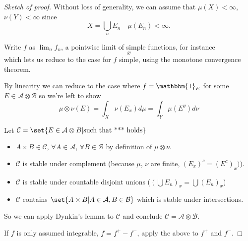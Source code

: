 \documentclass{article}
\newcommand{\1}[1]{\mathbbm{1}_{#1}}
\begin{document}
\begin{proof}[Sketch of proof]
    Without loss of generality, we can assume that $\mu(X) < \infty$, $\nu(Y) < \infty$ since
    \begin{equation*}
        X = \bigcup_n E_n \quad \mu(E_n) < \infty.
    \end{equation*}

    Write $f$ as $\lim_n f_n$, a pointwise limit of simple functions, for instance
    \begin{equation*}
        x %
    \end{equation*}
    which lets us reduce to the case for $f$ simple, using the monotone convergence theorem.

    By linearity we can reduce to the case where $f = \1{E}$ for some $E \in \mathcal{A} \otimes \mathcal{B}$ so we're left to show
    \begin{equation*}
        \mu \otimes \nu(E) = \int_X \nu(E_x) d \mu = \int_Y \mu(E^y) d \nu \tag{$***$}
    \end{equation*}

    Let $\mathcal{C} = \set{E \in \mathcal{A} \otimes B | \text{such that *** holds}}$
    \begin{itemize}
        \item $A \times B \in \mathcal{C}$, $\forall A \in \mathcal{A}$, $\forall B \in \mathcal{B}$ by definition of $\mu \otimes \nu$.
        \item $\mathcal{C}$ is stable under complement (because $\mu$, $\nu$ are finite, $(E_x)^c = (E^c)_x)$).
        \item $\mathcal{C}$ is stable under countable disjoint unions ($(\bigcup E_n)_x = \bigcup(E_n)_x$)
        \item $\mathcal{C}$ contains $\set{A \times B | A \in \mathcal{A}, B \in \mathcal{B}}$ which is stable under intersections.
    \end{itemize}
    So we can apply Dynkin's lemma to $\mathcal{C}$ and conclude $\mathcal{C} = \mathcal{A} \otimes \mathcal{B}$.

    If $f$ is only assumed integrable, $f = f^+ - f^-$, apply the above to $f^+$ and $f^-$.
\end{proof}


\end{document}
